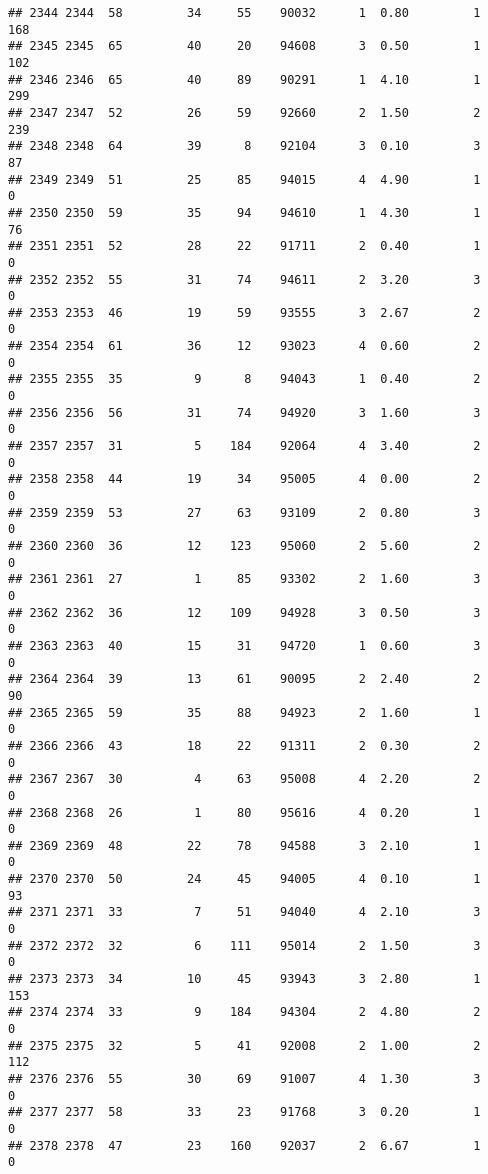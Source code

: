 \documentclass[
]{article}
\begin{document}
\begin{verbatim}
## 2344 2344  58         34     55    90032      1  0.80         1      168
## 2345 2345  65         40     20    94608      3  0.50         1      102
## 2346 2346  65         40     89    90291      1  4.10         1      299
## 2347 2347  52         26     59    92660      2  1.50         2      239
## 2348 2348  64         39      8    92104      3  0.10         3       87
## 2349 2349  51         25     85    94015      4  4.90         1        0
## 2350 2350  59         35     94    94610      1  4.30         1       76
## 2351 2351  52         28     22    91711      2  0.40         1        0
## 2352 2352  55         31     74    94611      2  3.20         3        0
## 2353 2353  46         19     59    93555      3  2.67         2        0
## 2354 2354  61         36     12    93023      4  0.60         2        0
## 2355 2355  35          9      8    94043      1  0.40         2        0
## 2356 2356  56         31     74    94920      3  1.60         3        0
## 2357 2357  31          5    184    92064      4  3.40         2        0
## 2358 2358  44         19     34    95005      4  0.00         2        0
## 2359 2359  53         27     63    93109      2  0.80         3        0
## 2360 2360  36         12    123    95060      2  5.60         2        0
## 2361 2361  27          1     85    93302      2  1.60         3        0
## 2362 2362  36         12    109    94928      3  0.50         3        0
## 2363 2363  40         15     31    94720      1  0.60         3        0
## 2364 2364  39         13     61    90095      2  2.40         2       90
## 2365 2365  59         35     88    94923      2  1.60         1        0
## 2366 2366  43         18     22    91311      2  0.30         2        0
## 2367 2367  30          4     63    95008      4  2.20         2        0
## 2368 2368  26          1     80    95616      4  0.20         1        0
## 2369 2369  48         22     78    94588      3  2.10         1        0
## 2370 2370  50         24     45    94005      4  0.10         1       93
## 2371 2371  33          7     51    94040      4  2.10         3        0
## 2372 2372  32          6    111    95014      2  1.50         3        0
## 2373 2373  34         10     45    93943      3  2.80         1      153
## 2374 2374  33          9    184    94304      2  4.80         2        0
## 2375 2375  32          5     41    92008      2  1.00         2      112
## 2376 2376  55         30     69    91007      4  1.30         3        0
## 2377 2377  58         33     23    91768      3  0.20         1        0
## 2378 2378  47         23    160    92037      2  6.67         1        0

\end{verbatim}
\end{document}
